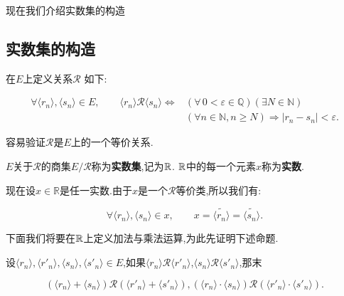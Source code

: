 现在我们介绍实数集的构造

\subsection{实数集的构造}

在$E$上定义关系\(\mathscr{R}\) 如下:

\[\begin{aligned}
\forall\langle r_n\rangle,\langle s_n\rangle\in E,\qquad
\langle r_n\rangle\mathscr R\langle s_n\rangle
\iff{}&(\forall\,0<\varepsilon\in\mathbb Q)(\exists N\in\mathbb N)\\
& (\forall n\in\mathbb N, n\ge N)\Longrightarrow |r_n-s_n|<\varepsilon.
\end{aligned}\]

容易验证\(\mathscr R\)是\(E\)上的一个等价关系.

\begin{mydef*}{}

$E$关于\(\mathscr R\)的商集\(E/\mathscr R\)称为\textbf{实数集},记为$\mathbb{R}$. $\mathbb{R}$中的每一个元素\(x\)称为\textbf{实数}.

\end{mydef*}

现在设\(x\in\mathbb R\)是任一实数.由于\(x\)是一个\(\mathscr R\)等价类,所以我们有:

\[\forall\langle r_n\rangle,\langle s_n\rangle\in x,\qquad
x=\widetilde{\langle r_n\rangle}=\widetilde{\langle s_n\rangle}.\]

下面我们将要在$\mathbb{R}$上定义加法与乘法运算,为此先证明下述命题.

\begin{myprop*}{}

设\(\langle r_n\rangle,\langle r'_n\rangle,\langle s_n\rangle,\langle s'_n\rangle\in E\),如果\(\langle r_n\rangle\mathscr R\langle r'_n\rangle\),\(\langle s_n\rangle\mathscr R\langle s'_n\rangle\),那末

\[(\langle r_n \rangle + \langle s_n \rangle) \mathscr{R}(\langle r'_n \rangle + \langle s'_n \rangle), (\langle r_n \rangle \cdot \langle s_n \rangle) \mathscr{R}(\langle r'_n \rangle \cdot \langle s'_n \rangle).\]

\end{myprop*}



